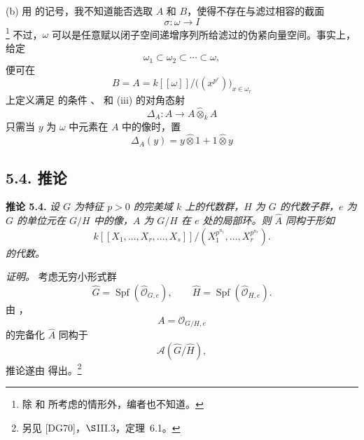 \medskip
\noindent\textup{(b)}
用  的记号，我不知道能否选取 \(A\) 和 \(B\)，使得不存在与滤过相容的截面
\[
  \sigma:\omega\longrightarrow I
\]
\footnote{%
\label{sga3:VIIB:nde:167}除  和  所考虑的情形外，编者也不知道。}
不过，\(\omega\) 可以是任意赋以闭子空间递增序列所给滤过的伪紧向量空间。事实上，给定
\[
  \omega_1\subset\omega_2\subset\cdots\subset\omega,
\]
便可在
\[
  B=A
  =
  k[[\omega]]
  \big/
  \bigl((x^{p^r})\bigr)_{x\in\omega_r}
\]
上定义满足  的条件 \textup{}、\textup{} 和 \textup{(iii)} 的对角态射
\[
  \Delta_A:A\longrightarrow A\widehat\otimes_kA
\]
只需当 \(y\) 为 \(\omega\) 中元素在 \(A\) 中的像时，置
\[
  \Delta_A(y)
  =
  y\widehat\otimes1+1\widehat\otimes y
\]

\subsection*{5.4. 推论}
\label{sga3:VIIB:5.4}

\noindent{}\textbf{推论 5.4.}
{\itshape 设 \(G\) 为特征 \(p>0\) 的完美域 \(k\) 上的代数群，\(H\) 为 \(G\) 的代数子群，\(e\) 为 \(G\) 的单位元在 \(G/H\) 中的像，\(A\) 为 \(G/H\) 在 \(e\) 处的局部环。则 \(\widehat A\) 同构于形如
\[
  k[[X_1,\ldots,X_r,\ldots,X_s]]
  \big/
  (X_1^{p^{n_1}},\ldots,X_r^{p^{n_r}}).
\]
的代数。}

\medskip
\noindent\textit{证明。}
考虑无穷小形式群
\[
  \widehat G
  =
  \operatorname{Spf}(\widehat{\mathcal O}_{G,e}),
  \qquad
  \widehat H
  =
  \operatorname{Spf}(\widehat{\mathcal O}_{H,e}).
\]
由 ，
\[
  A=\mathcal O_{G/H,e}
\]
的完备化 \(\widehat A\) 同构于
\[
  \mathscr A(\widehat G/\widehat H),
\]
推论遂由 \textup{} 得出。\footnote{%
\label{sga3:VIIB:nde:168}另见 \textup{[DG70]}，\(\S\)III.3，定理~6.1。}

